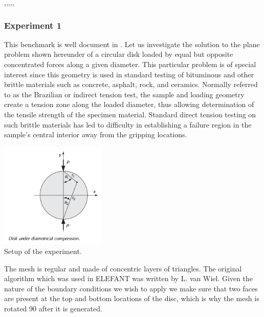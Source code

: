 

\Literature \cite{brhb14},\cite{brsp11},\cite{brsp14},\cite{hiok66},\cite{brze95},\cite{wami15}
\cite{wowu95}\cite{zhwd90}

\subsubsection*{Experiment 1}

This benchmark is well document in \cite{sadd14}.
Let us investigate the solution to the plane problem shown hereunder of a circular disk 
loaded by equal but opposite concentrated forces along a given diameter. 
This particular problem is of special interest since this geometry is used 
in standard testing of bituminous and other brittle materials such as 
concrete, asphalt, rock, and ceramics. Normally referred to as the Brazilian or indirect tension test, 
the sample and loading geometry create a tension zone along the loaded diameter, 
thus allowing determination of the tensile strength of the specimen material. 
Standard direct tension testing on such brittle materials has led to difficulty 
in establishing a failure region in the sample’s central interior away from 
the gripping locations.

\begin{center}
\includegraphics[width=5cm]{python_codes/fieldstone_58/experiment1/setup}\\
{\captionfont Setup of the experiment.}
\end{center}

The mesh is regular and made of concentric layers of triangles. The original algorithm
which was used in ELEFANT was written by L. van Wiel.  Given the nature of the boundary 
conditions we wish to apply we make sure that two faces are present at the top and bottom 
locations of the disc, which is why the mesh is rotated 90\degree 
after it is generated.  

